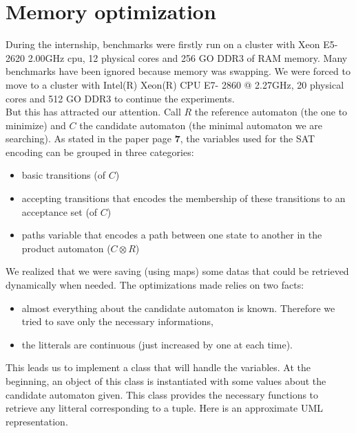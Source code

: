 \section{Memory optimization}
During the internship, benchmarks were firstly run on a cluster with Xeon E5-2620 2.00GHz cpu, 12
physical cores and 256 GO DDR3 of RAM memory. Many benchmarks have been ignored because memory was
swapping. We were forced to move to a cluster with Intel(R) Xeon(R) CPU E7- 2860  @ 2.27GHz, 20 physical
cores and 512 GO DDR3 to continue the experiments.\\

But this has attracted our attention. Call $R$ the reference automaton (the one to minimize) and $C$
the candidate automaton (the minimal automaton we are searching). As stated in the \cite{14} paper page
\textbf{7}, the variables used for the SAT encoding can be grouped in three categories:

\begin{itemize}
 \item basic transitions (of $C$)
 \item accepting transitions that encodes the membership of these transitions to an acceptance set
       (of $C$)
 \item paths variable that encodes a path between one state to another in the product automaton
       ($C \otimes R$)
\end{itemize}

We realized that we were saving (using maps) some datas that could be retrieved dynamically when needed. The
optimizations made relies on two facts:
\begin{itemize}
 \item almost everything about the candidate automaton is known. Therefore we tried to save only the
       necessary informations,
 \item the litterals are continuous (just increased by one at each time).
\end{itemize}

\noindent This leads us to implement a class that will handle the variables. At the beginning, an object of
this class is instantiated with some values about the candidate automaton given. This class provides the
necessary functions to retrieve any litteral corresponding to a tuple. Here is an approximate UML
representation.\\

